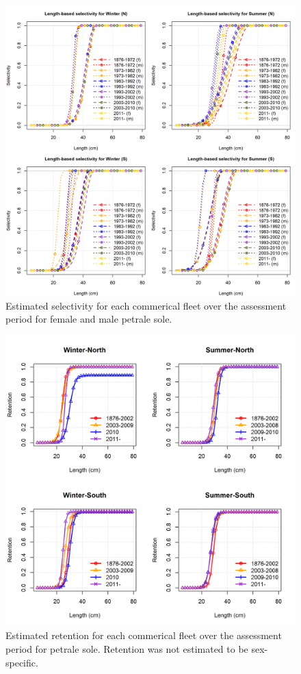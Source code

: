 \documentclass[12pt,]{article}
\begin{document}
\FloatBarrier 

\begin{figure}
\centering
\includegraphics{Figures/Petrale_fishery_selectivity.png}
\caption{Estimated selectivity for each commerical fleet over the
assessment period for female and male petrale sole.
\label{fig:fish_selex}}
\end{figure}

\FloatBarrier

\begin{figure}
\centering
\includegraphics{Figures/Petrale_retention.png}
\caption{Estimated retention for each commerical fleet over the
assessment period for petrale sole. Retention was not estimated to be
sex-specific. \label{fig:fish_reten}}
\end{figure}
\end{document}
